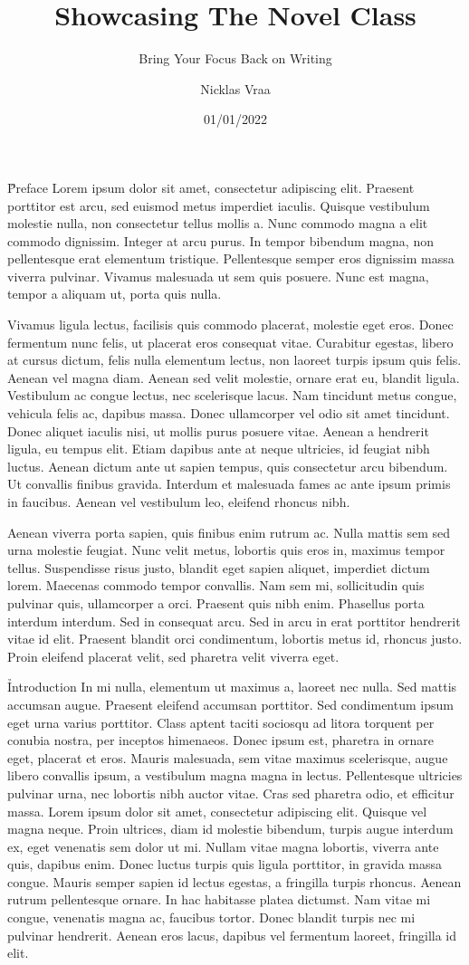 \documentclass{novel}
\title{Showcasing The Novel Class}
\subtitle{Bring Your Focus Back on Writing}
\author{Nicklas Vraa}
\date{01/01/2022}
\begin{document}
\metadata

\H{Preface}
Lorem ipsum dolor sit amet, consectetur adipiscing elit. Praesent porttitor est arcu, sed euismod metus imperdiet iaculis. Quisque vestibulum molestie nulla, non consectetur tellus mollis a. Nunc commodo magna a elit commodo dignissim. Integer at arcu purus. In tempor bibendum magna, non pellentesque erat elementum tristique. Pellentesque semper eros dignissim massa viverra pulvinar. Vivamus malesuada ut sem quis posuere. Nunc est magna, tempor a aliquam ut, porta quis nulla.

Vivamus ligula lectus, facilisis quis commodo placerat, molestie eget eros. Donec fermentum nunc felis, ut placerat eros consequat vitae. Curabitur egestas, libero at cursus dictum, felis nulla elementum lectus, non laoreet turpis ipsum quis felis. Aenean vel magna diam. Aenean sed velit molestie, ornare erat eu, blandit ligula. Vestibulum ac congue lectus, nec scelerisque lacus. Nam tincidunt metus congue, vehicula felis ac, dapibus massa. Donec ullamcorper vel odio sit amet tincidunt. Donec aliquet iaculis nisi, ut mollis purus posuere vitae. Aenean a hendrerit ligula, eu tempus elit. Etiam dapibus ante at neque ultricies, id feugiat nibh luctus. Aenean dictum ante ut sapien tempus, quis consectetur arcu bibendum. Ut convallis finibus gravida. Interdum et malesuada fames ac ante ipsum primis in faucibus. Aenean vel vestibulum leo, eleifend rhoncus nibh.

Aenean viverra porta sapien, quis finibus enim rutrum ac. Nulla mattis sem sed urna molestie feugiat. Nunc velit metus, lobortis quis eros in, maximus tempor tellus. Suspendisse risus justo, blandit eget sapien aliquet, imperdiet dictum lorem. Maecenas commodo tempor convallis. Nam sem mi, sollicitudin quis pulvinar quis, ullamcorper a orci. Praesent quis nibh enim. Phasellus porta interdum interdum. Sed in consequat arcu. Sed in arcu in erat porttitor hendrerit vitae id elit. Praesent blandit orci condimentum, lobortis metus id, rhoncus justo. Proin eleifend placerat velit, sed pharetra velit viverra eget.

\h{Introduction}
In mi nulla, elementum ut maximus a, laoreet nec nulla. Sed mattis accumsan augue. Praesent eleifend accumsan porttitor. Sed condimentum ipsum eget urna varius porttitor. Class aptent taciti sociosqu ad litora torquent per conubia nostra, per inceptos himenaeos. Donec ipsum est, pharetra in ornare eget, placerat et eros. Mauris malesuada, sem vitae maximus scelerisque, augue libero convallis ipsum, a vestibulum magna magna in lectus. Pellentesque ultricies pulvinar urna, nec lobortis nibh auctor vitae. Cras sed pharetra odio, et efficitur massa. Lorem ipsum dolor sit amet, consectetur adipiscing elit. Quisque vel magna neque. Proin ultrices, diam id molestie bibendum, turpis augue interdum ex, eget venenatis sem dolor ut mi. Nullam vitae magna lobortis, viverra ante quis, dapibus enim. Donec luctus turpis quis ligula porttitor, in gravida massa congue. Mauris semper sapien id lectus egestas, a fringilla turpis rhoncus. Aenean rutrum pellentesque ornare. In hac habitasse platea dictumst. Nam vitae mi congue, venenatis magna ac, faucibus tortor. Donec blandit turpis nec mi pulvinar hendrerit. Aenean eros lacus, dapibus vel fermentum laoreet, fringilla id elit.
\end{document}
